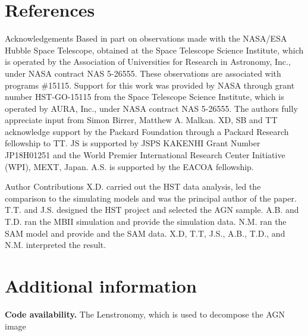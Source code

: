 \documentclass{natureprintstyle}
\newcommand{\lenstronomy}{{\sc Lenstronomy}}
\begin{document}

\section*{References}
 


\begin{addendum}
 \item[Acknowledgements] 
Based in part on observations made with the NASA/ESA Hubble Space Telescope, obtained at the Space Telescope Science Institute, which is operated by the Association of Universities for Research in Astronomy, Inc., under NASA contract NAS 5-26555. These observations are associated with programs \#15115. Support for this work was provided by NASA through grant number HST-GO-15115 from the Space Telescope Science Institute, which is operated by AURA, Inc., under NASA contract NAS 5-26555. The authors fully appreciate input from Simon Birrer, Matthew A. Malkan. XD, SB and TT acknowledge support by the Packard Foundation through a Packard Research fellowship to TT. JS is supported by JSPS KAKENHI Grant Number JP18H01251 and the World Premier International Research Center Initiative (WPI), MEXT, Japan. A.S. is supported by the EACOA fellowship.

%
\item[Author Contributions] X.D. carried out the HST data analysis, led the comparison to the simulating models and was the principal author of the paper. T.T. and J.S. designed the HST project and selected the AGN sample. A.B. and T.D. ran the MBII simulation and provide the simulation data. N.M. ran the SAM model and provide and the SAM data. X.D, T.T, J.S., A.B., T.D., and N.M. interpreted the result.

\end{addendum}

\section*{Additional information}
\textbf{Code availability.} The \lenstronomy, which is used to decompose the AGN image  
\end{document}
